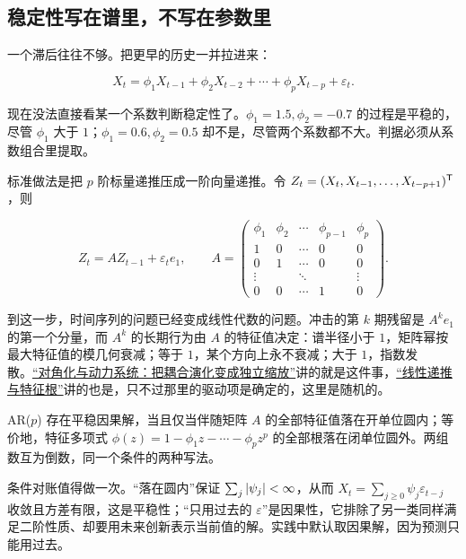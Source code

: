 \subsection{稳定性写在谱里，不写在参数里}

一个滞后往往不够。把更早的历史一并拉进来：

\[
X_t=\phi_1X_{t-1}+\phi_2X_{t-2}+\cdots+\phi_pX_{t-p}+\varepsilon_t.
\]

现在没法直接看某一个系数判断稳定性了。\(\phi_1=1.5,\phi_2=-0.7\) 的过程是平稳的，尽管 \(\phi_1\) 大于 \(1\)；\(\phi_1=0.6,\phi_2=0.5\) 却不是，尽管两个系数都不大。判据必须从系数组合里提取。

标准做法是把 \(p\) 阶标量递推压成一阶向量递推。令 \(Z_t=(X_t,X_{t-1},\ldots,X_{t-p+1})^{\mathsf{T}}\)，则

\[
Z_t=A Z_{t-1}+\varepsilon_t e_1,
\qquad
A=\begin{pmatrix}
\phi_1 & \phi_2 & \cdots & \phi_{p-1} & \phi_p\\
1 & 0 & \cdots & 0 & 0\\
0 & 1 & \cdots & 0 & 0\\
\vdots & & \ddots & & \vdots\\
0 & 0 & \cdots & 1 & 0
\end{pmatrix}.
\]

到这一步，时间序列的问题已经变成线性代数的问题。冲击的第 \(k\) 期残留是 \(A^k e_1\) 的第一个分量，而 \(A^k\) 的长期行为由 \(A\) 的特征值决定：谱半径小于 \(1\)，矩阵幂按最大特征值的模几何衰减；等于 \(1\)，某个方向上永不衰减；大于 \(1\)，指数发散。\hyperref[sec:03-Linear-Algebra/05-Eigenvalues-and-Eigenvectors/02]{``对角化与动力系统：把耦合演化变成独立缩放''}讲的就是这件事，\hyperref[sec:04-Discrete-Mathematics/02-Recurrences/02]{``线性递推与特征根''}讲的也是，只不过那里的驱动项是确定的，这里是随机的。

\begin{proposition}
AR(\(p\)) 存在平稳因果解，当且仅当伴随矩阵 \(A\) 的全部特征值落在开单位圆内；等价地，特征多项式 \(\phi(z)=1-\phi_1z-\cdots-\phi_pz^p\) 的全部根落在闭单位圆外。两组数互为倒数，同一个条件的两种写法。
\end{proposition}

条件对账值得做一次。``落在圆内''保证 \(\sum_j\left|\psi_j\right|<\infty\)，从而 \(X_t=\sum_{j\ge0}\psi_j\varepsilon_{t-j}\) 收敛且方差有限，这是平稳性；``只用过去的 \(\varepsilon\)''是因果性，它排除了另一类同样满足二阶性质、却要用未来创新表示当前值的解。实践中默认取因果解，因为预测只能用过去。

